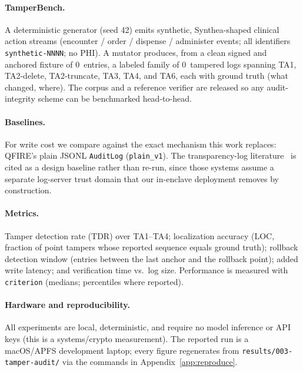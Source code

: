 \documentclass[11pt]{article}
\providecommand{\NumPrompts}{0}
\providecommand{\NumAttacks}{0}
\begin{document}
\paragraph{TamperBench.}\label{sec:benchmark} A deterministic generator (seed 42)
emits synthetic, Synthea-shaped clinical action streams (encounter / order /
dispense / administer events; all identifiers \texttt{synthetic-NNNN}; no PHI). A
mutator produces, from a clean signed and anchored fixture of \NumPrompts{}~entries,
a labeled family of \NumAttacks{}~tampered logs spanning TA1, TA2-delete,
TA2-truncate, TA3, TA4, and TA6, each with ground truth (what changed, where). The
corpus and a reference verifier are released so any audit-integrity scheme can be
benchmarked head-to-head.

\paragraph{Baselines.} For write cost we compare against the exact mechanism this
work replaces: QFIRE's plain JSONL \texttt{AuditLog} (\texttt{plain\_v1}). The
transparency-log literature~\cite{rfc6962,trillian,merkle1987,haber1991timestamp}
is cited as a design baseline rather than re-run, since those systems assume a
separate log-server trust domain that our in-enclave deployment removes by
construction.

\paragraph{Metrics.} Tamper detection rate (TDR) over TA1--TA4; localization
accuracy (LOC, fraction of point tampers whose reported sequence equals ground
truth); rollback detection window (entries between the last anchor and the rollback
point); added write latency; and verification time vs.\ log size. Performance is
measured with \texttt{criterion} (medians; percentiles where reported).

\paragraph{Hardware and reproducibility.} All experiments are local, deterministic,
and require no model inference or API keys (this is a systems/crypto measurement).
The reported run is a macOS/APFS development laptop; every figure regenerates from
\texttt{results/003-tamper-audit/} via the commands in
Appendix~\ref{app:reproduce}.

\end{document}
